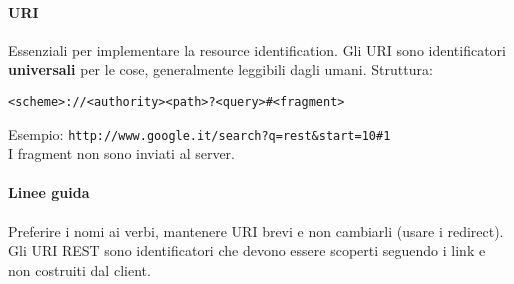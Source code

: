 \documentclass[10pt]{article}
\begin{document}
\paragraph{URI} Essenziali per implementare la resource identification. Gli URI sono identificatori \textbf{universali} per le cose, generalmente leggibili dagli umani. Struttura:\begin{center}
\texttt{<scheme>://<authority><path>?<query>\#<fragment>}
\end{center}
Esempio: \texttt{http://www.google.it/search?q=rest\&start=10\#1}\\
I fragment non sono inviati al server.
\paragraph{Linee guida} Preferire i nomi ai verbi, mantenere URI brevi e non cambiarli (usare i redirect).\\
Gli URI REST sono identificatori che devono essere scoperti seguendo i link e non costruiti dal client.
\end{document}
